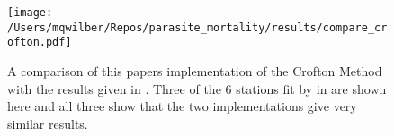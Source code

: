 \documentclass[12pt, a4paper]{article}
\begin{document}
\begin{figure}
    \centering
    \texttt{[image: /Users/mqwilber/Repos/parasite\_mortality/results/compare\_crofton.pdf]}
    \caption{A comparison of this papers implementation of the Crofton Method with the results given in \cite{Crofton1971a}.  Three of the 6 stations fit by in \citep{Crofton1971a} are shown here and all three show that the two implementations give very similar results.}
    \label{fig:crof_test}

\end{figure}



\singlespacing


\end{document}
